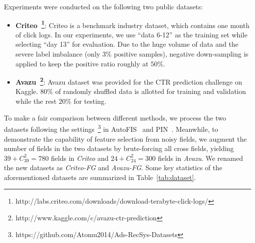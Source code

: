 \documentclass[10pt,journal,compsoc]{IEEEtran}
\begin{document}
\begin{table}[t]
\caption{Statistics of Evaluation Datasets}
\label{tab:dataset}
\centering
{}
\end{table}

Experiments were conducted on the following two public datasets:
\begin{itemize}
    \item \textbf{Criteo~\footnote{http://labs.criteo.com/downloads/download-terabyte-click-logs/}}: Criteo is a benchmark industry dataset, which contains one month of click logs. In our experiments, we use ``data 6-12'' as the training set while selecting ``day 13'' for evaluation. 
    {Due to the huge volume of data and the severe label imbalance (only 3\% positive samples)}, negative down-sampling is applied to keep the positive ratio roughly at $50\%$. 
    \item \textbf{Avazu~\footnote{http://www.kaggle.com/c/avazu-ctr-prediction}}: Avazu dataset was provided for the CTR prediction challenge on Kaggle. $80\%$ of randomly  shuffled data is allotted for training and validation while the rest $20\%$ for testing. 
\end{itemize}

To make a fair comparison between different methods, we process the two datasets following the settings~\footnote{https://github.com/Atomu2014/Ads-RecSys-Datasets} in AutoFIS~\cite{liu2020autofis} and PIN~\cite{pin_2019}.  
 Meanwhile, to demonstrate the capability of feature selection from noisy fields, we augment the number of fields in the two datasets by brute-forcing all cross fields, yielding $39 + C_{39}^2 = 780$ fields in \emph{Criteo} and $24 + C_{24}^2 = 300$ fields in \emph{Avazu}. 
We renamed the new datasets as \emph{Criteo-FG} and \emph{Avazu-FG}. Some key statistics of the aforementioned datasets are summarized in Table~\ref{tab:dataset}.
\end{document}
